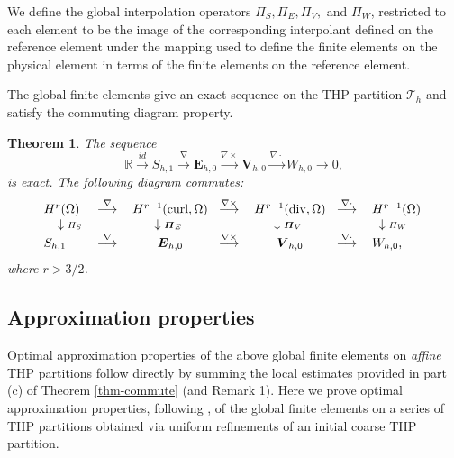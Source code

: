 \documentclass[twoside,reqno,final]{amsart}
\newtheorem{theorem}{Theorem}
\renewcommand{\b}[1]{{\boldsymbol{#1}}}
\newcommand{\bR}{\mathbb R}
\newcommand{\curls}{{{\nabla\times}}}
\newcommand{\divs}{{\nabla\cdot}}
\newcommand{\grads}{{\nabla}}
\begin{document}
We define the global interpolation operators $\varPi_S, \b\varPi_E,\b\varPi_V,$ and $\varPi_W$, restricted to each element
to be the image of the corresponding interpolant defined on the reference element under the mapping used to define the 
finite elements on the physical element in terms of the finite elements on the reference element.


The global finite elements give an exact sequence on the {\sf THP} partition $\mathcal{T}_h$ and satisfy the 
commuting diagram property.

\begin{theorem}
\label{thm-exact-g}
{\em{}}
The sequence 
 \[
 \bR
\overset{id}{\longrightarrow}
S_{h,1}
\overset{\grads}{\longrightarrow} 
\b E_{h,0}
\overset{\curls}{\longrightarrow} 
\b V_{h,0}
\overset{\divs}{\longrightarrow} 
W_{h,0}
\overset{}{\longrightarrow} 0,
 \]
is exact.\newline
{\em{}}
The following diagram {\em commutes}:
\begin{alignat*}{2}
\begin{tabular}{l c c c c c l l}
$H^r({\Omega})$&
$\overset{\grads}{\longrightarrow} $&
$H^{r-1}(\mathrm{curl},\Omega)\!\!$&
$\overset{\curls}{\longrightarrow} $&
$H^{r-1}(\mathrm{div},\Omega)\!\!$&
$\overset{\divs}{\longrightarrow} $&
$H^{r-1}(\Omega)\;$\\
$\;\;\;\;\downarrow {\scriptstyle \varPi_S}$ & &
$\downarrow{\scriptstyle\b \varPi_E}$
& &$\downarrow{\scriptstyle\b \varPi_V}$
& &
$\;\;\downarrow{\scriptstyle \varPi_W}$
\\
$S_{h,1}\!\!$&
$\overset{\grads}{\longrightarrow}$ &
$\b E_{h,0}\!\!$&
$\overset{\curls}{\longrightarrow}$ &
$\b V_{h,0}\!\!$&
$\overset{\divs}{\longrightarrow}$ &
$W_{h,0}$,
\end{tabular}
\end{alignat*}
where $r>3/2$.
\end{theorem}

\subsection{Approximation properties}
Optimal approximation properties of the above
global finite elements on {\it affine} {\sf THP} partitions 
follow directly by summing the local estimates provided in
part (c) of Theorem \ref{thm-commute} (and Remark 1).
Here we prove optimal approximation properties, following \cite{RannacherTurek92, IngramWheelerYotov10}, 
of the global finite elements on 
a series of {\sf THP} partitions obtained via uniform refinements of an initial coarse {\sf THP} partition. 
\end{document}
